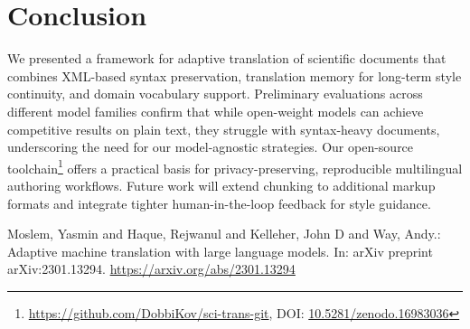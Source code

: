 \documentclass[runningheads]{llncs}
\begin{document}
\section{Conclusion}
We presented a framework for adaptive translation of scientific documents that
combines XML-based syntax preservation, translation memory for long-term style
continuity, and domain vocabulary support. Preliminary evaluations across
different model families confirm that while open-weight models can achieve
competitive results on plain text, they struggle with syntax-heavy documents,
underscoring the need for our model-agnostic strategies. Our open-source
toolchain\footnote{\url{https://github.com/DobbiKov/sci-trans-git}, DOI:
\href{https://doi.org/10.5281/zenodo.16983036}{10.5281/zenodo.16983036}} offers
a practical basis for privacy-preserving, reproducible multilingual authoring
workflows. Future work will extend chunking to additional markup formats and
integrate tighter human-in-the-loop feedback for style guidance.


%
%



\begin{thebibliography}{8}
Moslem, Yasmin and Haque, Rejwanul and Kelleher, John D and Way, Andy.: Adaptive machine translation with large language models. In: arXiv preprint arXiv:2301.13294. \url{https://arxiv.org/abs/2301.13294}
\end{thebibliography}
\end{document}
